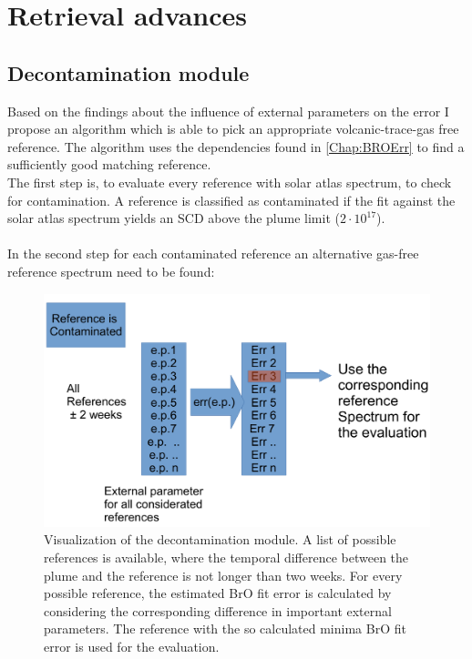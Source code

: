 \documentclass  [
  paper    = a4,
  BCOR     = 10mm,
  twoside,
  fontsize = 12pt,
  fleqn,
  toc      = bibnumbered,
  toc      = listofnumbered,
  numbers  = noendperiod,
  headings = normal,
  listof   = leveldown,
  version  = 3.03
]                                       {scrreprt}
\begin{document}
	\part{Retrieval advances}
\chapter{Decontamination module \label{chapt:contbased}}

	Based on the findings about the influence of external parameters on the  error I propose an algorithm which is able to pick an appropriate volcanic-trace-gas free reference. The algorithm uses the dependencies found in \cref{Chap:BROErr} to find a sufficiently good matching reference.\\ 
	The first step is, to evaluate every reference with solar atlas spectrum, to check for contamination. A reference is classified as contaminated if the fit against the solar atlas spectrum yields an  SCD above the plume limit ($2\cdot 10^{17}$).\\
	\\
	In the second step for each contaminated reference an alternative gas-free reference spectrum need to be found:
	\begin{figure}
		\centering
		\includegraphics[width=0.7\linewidth]{Bilder/Cont}
		\caption{Visualization of the decontamination module. A list of possible references is available, where the temporal difference between the plume and the reference is not longer than two weeks. For every possible reference, the estimated BrO fit error is calculated by considering the corresponding difference in important external parameters. The reference with the so calculated minima BrO fit error is used for the evaluation.}
		\label{fig:Cont}
	\end{figure}
\end{document}
